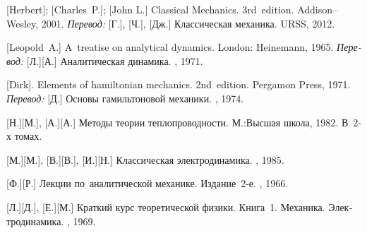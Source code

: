 \begin{thebibliography}{123}
\begin{otherlanguage}{russian}
%

[Herbert]; [Charles~P.]; [John L.] Classical Mechanics. 3rd~edition. Addison\hbox{--}Wesley, 2001. 
\emph{Перевод:} [Г.], [Ч.], [Дж.] Классическая механика. URSS, 2012. 


[Leopold~A.] A~treatise on analytical dynamics.
London: Heinemann, 1965. 
\emph{Перевод:} [Л.][А.] Аналитическая динамика. \naukapublisher, 1971. 

[Dirk]. Elements of hamiltonian mechanics. 2nd~edition. Pergamon Press, 1971. 
\emph{Перевод:} [Д.] Основы гамильтоновой механики. \naukapublisher, 1974. 

[Н.][М.], [А.][А.] Методы теории теплопроводности. М.:\;Высшая школа, 1982. В~2\hbox{-}х томах.

[М.][М.], [В.][В.], [И.][Н.] Классическая электродинамика. \naukapublisher, 1985. 

[Ф.][Р.] Лекции по~аналитической механике. Издание~2\hbox{-}е. \naukapublisher, 1966. 

[Л.][Д.], [Е.][М.] Краткий курс теоретической физики. Книга~1. Механика. Электродинамика. \naukapublisher, 1969. 


\end{otherlanguage}
\end{thebibliography}
